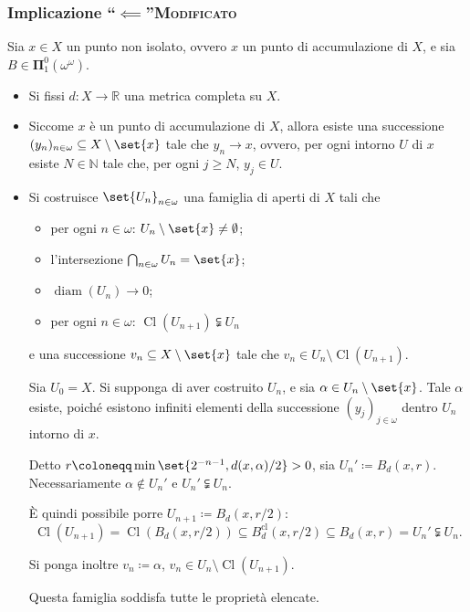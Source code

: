 \documentclass{article}
\newcommand{\1}{\mathds{1}}
\newcommand{\R}{\mathds{R}}
\newcommand{\N}{\mathds{N}}
\begin{document}
\subsubsection{Implicazione ``\(\impliedby\)''\hfill{}\textsc{Modificato}}
\label{sec:org13774d8}

Sia \(x \in X\) un punto non isolato, ovvero \(x\) un punto di accumulazione di \(X\), e sia \(B \in \bm{\Pi}_{1}^{0}(\omega^{\omega})\).

\begin{itemize}
\item Si fissi \(d:X\to \R\) una metrica completa su \(X\).
\item Siccome \(x\) è un punto di accumulazione di \(X\), allora esiste una successione \((y_{n})_{n \in \omega} \subseteq X\setminus\set{x}\) tale che \(y_{n}\to x\), ovvero, per ogni intorno \(U\) di \(x\) esiste \(N \in \N\) tale che, per ogni \(j\ge N\), \(y_{j} \in U\).

\item Si costruisce \(\set{U_{n}}_{n \in \omega}\) una famiglia di aperti di \(X\) tali che
\begin{itemize}
\item per ogni \(n \in \omega\): \(U_{n}\setminus \set{x}\neq \emptyset\);
\item l'intersezione \(\bigcap_{n \in \omega} U_{n} = \set{x}\);
\item \(\operatorname{diam}(U_{n})\to 0\);
\item per ogni \(n \in \omega\): \(\operatorname{Cl}(U_{n+1}) \subsetneqq U_{n}\)
\end{itemize}
e una successione \(v_{n} \subseteq X\setminus \set{x}\) tale che \(v_{n} \in U_{n}\setminus \operatorname{Cl}(U_{n+1})\).

Sia \(U_{0} = X\). Si supponga di aver costruito \(U_{n}\), e sia \(\alpha \in U_{n}\setminus\set{x}\). Tale \(\alpha\) esiste, poiché esistono infiniti elementi della successione \((y_{j})_{j \in \omega}\) dentro \(U_{n}\) intorno di \(x\).

Detto \(r\coloneqq\min\set{2^{-n-1}, d(x,\alpha)/2}>0\), sia \(U_{n}'\coloneqq B_{d}(x,r)\). Necessariamente \(\alpha\notin U_{n}'\) e \(U_{n}' \subsetneqq U_{n}\).

È quindi possibile porre \(U_{n+1}\coloneqq B_{d}(x,r/2)\):
\begin{equation*}
  	\operatorname{Cl}(U_{n+1}) = \operatorname{Cl} \left(B_{d}(x,r/2)\right) \subseteq B_{d}^{\text{cl}}(x,r/2) \subseteq B_{d}(x,r) = U_{n}' \subsetneqq U_{n}.
\end{equation*}

Si ponga inoltre \(v_{n} \coloneqq \alpha\), \(v_{n} \in U_{n}\setminus \operatorname{Cl}(U_{n+1})\).

Questa famiglia soddisfa tutte le proprietà elencate.
\end{itemize}
\end{document}
